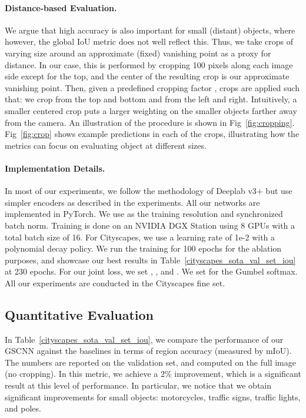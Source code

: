 \documentclass[10pt,twocolumn,letterpaper]{article}
\begin{document}
\paragraph{Distance-based Evaluation.}
We argue that high accuracy is also important for small (distant) objects, where however, the global IoU metric does not well reflect this. 
Thus, we take crops of varying size around an approximate (fixed) vanishing point as a proxy for distance. 
In our case, this is performed by cropping 100 pixels along each image side except for the top, and the center of the resulting crop is our approximate  vanishing point.
Then, given a predefined cropping factor 
, crops are applied such that:  we crop  from the top and bottom and  from the left and right. 
Intuitively,  a smaller centered crop puts a larger weighting on the smaller objects farther away from the camera. 
An illustration of the procedure is shown in Fig~\ref{fig:cropping}. Fig~\ref{fig:crop} shows example predictions in each of the crops, illustrating how the metrics can focus on evaluating object at different sizes. 
 
 \vspace{-3mm}
 \paragraph{Implementation Details.}
In most of our experiments, we follow the methodology of Deeplab v3+ \cite{deeplabv3plus2018} but use simpler encoders as described in the experiments. 
All our networks are implemented in PyTorch. 
We use   as the training resolution and synchronized batch norm. Training is done on an NVIDIA DGX Station using 8 GPUs with a total batch size of 16.
For Cityscapes, we use a learning rate of 1e-2 with a polynomial decay policy. 
We run the training for 100 epochs for the ablation purposes, and showcase our best results in Table~\ref{cityscapes_sota_val_set_iou} at 230 epochs. 
For our joint loss, we set , ,  and . We set  for the Gumbel softmax.
All our experiments are conducted in the Cityscapes fine set.

\subsection{Quantitative Evaluation}

In Table~\ref{cityscapes_sota_val_set_iou}, we compare the performance of our GSCNN against the baselines in terms of region accuracy (measured by mIoU). The numbers are reported on the validation set, and computed on the full image (no cropping). 
In this metric, we achieve a 2\% improvement, which is a significant result at this level of performance.
In particular, we notice that we obtain significant improvements for small objects:
motorcycles, traffic signs, traffic lights, and poles. 
\end{document}
